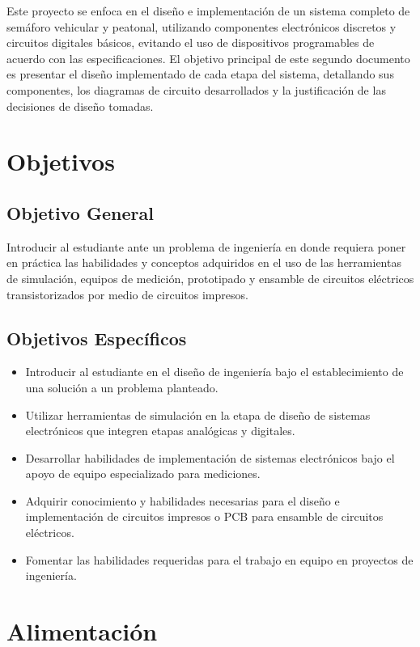 \documentclass[12pt, journal, onecolumn]{IEEEtran}
\begin{document}
	Este proyecto se enfoca en el diseño e implementación de un sistema completo de semáforo vehicular y peatonal, utilizando componentes electrónicos discretos y circuitos digitales básicos, evitando el uso de dispositivos programables de acuerdo con las especificaciones. El objetivo principal de este segundo documento es presentar el diseño implementado de cada etapa del sistema, detallando sus componentes, los diagramas de circuito desarrollados y la justificación de las decisiones de diseño tomadas.
	
	\section{Objetivos}
	\subsection{Objetivo General}
	Introducir al estudiante ante un problema de ingeniería en donde requiera poner en práctica las habilidades y conceptos adquiridos en el uso de las herramientas de simulación, equipos de medición, prototipado y ensamble de circuitos eléctricos transistorizados por medio de circuitos impresos.
	
	\subsection{Objetivos Específicos}
	\begin{itemize}
		\item Introducir al estudiante en el diseño de ingeniería bajo el establecimiento de una solución a un problema planteado.
		\item Utilizar herramientas de simulación en la etapa de diseño de sistemas electrónicos que integren etapas analógicas y digitales.
		\item Desarrollar habilidades de implementación de sistemas electrónicos bajo el apoyo de equipo especializado para mediciones.
		\item Adquirir conocimiento y habilidades necesarias para el diseño e implementación de circuitos impresos o PCB para ensamble de circuitos eléctricos.
		\item Fomentar las habilidades requeridas para el trabajo en equipo en proyectos de ingeniería.
	\end{itemize}
	
	\section{\textbf{Alimentación}}
\end{document}
